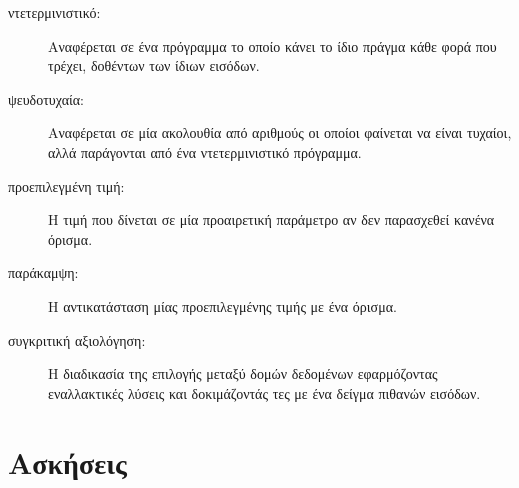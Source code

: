 \documentclass[10pt]{book}
\begin{document}
\begin{description}

\item[ντετερμινιστικό:] Αναφέρεται σε ένα πρόγραμμα το οποίο κάνει το ίδιο πράγμα κάθε φορά που τρέχει, δοθέντων των ίδιων εισόδων.

\item[ψευδοτυχαία:] Αναφέρεται σε μία ακολουθία από αριθμούς οι οποίοι φαίνεται να είναι τυχαίοι, αλλά παράγονται από ένα ντετερμινιστικό πρόγραμμα.

\item[προεπιλεγμένη τιμή:] Η τιμή που δίνεται σε μία προαιρετική παράμετρο αν δεν παρασχεθεί κανένα όρισμα.

\item[παράκαμψη:] Η αντικατάσταση μίας προεπιλεγμένης τιμής με ένα όρισμα.

\item[συγκριτική αξιολόγηση:] Η διαδικασία της επιλογής μεταξύ δομών δεδομένων εφαρμόζοντας εναλλακτικές λύσεις και δοκιμάζοντάς τες με ένα δείγμα πιθανών εισόδων.

\end{description}


\section{Ασκήσεις}
\end{document}

